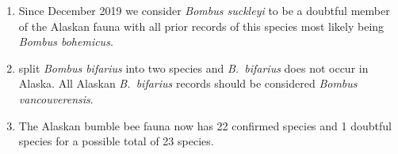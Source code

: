 \begin{center}
{\begin{enumerate}
\item Since December 2019 we consider \textit{Bombus suckleyi} to be a doubtful member of the Alaskan fauna with all prior records of this species most likely being \textit{Bombus bohemicus}. 

\item \citet{Ghisbainetal2020} split \textit{Bombus bifarius} into two species and \textit{B.\ bifarius} does not occur in Alaska. All Alaskan \textit{B.\ bifarius} records should be considered \textit{Bombus vancouverensis}.

\item The Alaskan bumble bee fauna now has 22 confirmed species and 1 doubtful species for a possible total of 23 species.

\end{enumerate}
 }
\end{center}

\vspace{4mm}

